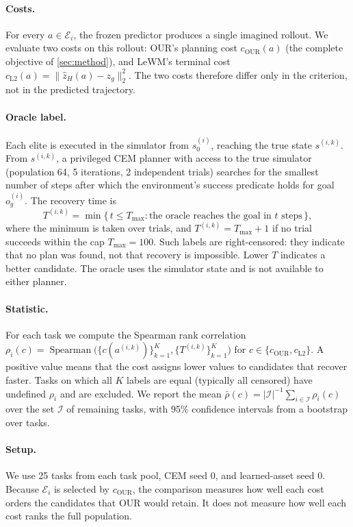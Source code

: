 \documentclass{article} %
\begin{document}
\paragraph{Costs.} For every $a \in \mathcal{E}_i$, the frozen predictor produces a single
imagined rollout. We evaluate two costs on this rollout: OUR's planning cost
$c_{\mathrm{OUR}}(a)$ (the complete objective of \cref{sec:method}), and LeWM's terminal cost
$c_{\mathrm{L2}}(a) = \lVert \hat z_H(a) - z_g \rVert_2^2$. The two costs therefore differ
only in the criterion, not in the predicted trajectory.

\paragraph{Oracle label.} Each elite is executed in the simulator from $s_0^{(i)}$, reaching
the true state $s^{(i,k)}$. From $s^{(i,k)}$, a privileged CEM planner with access to
the true simulator (population 64, 5 iterations, 2 independent trials) searches for the
smallest number of steps after which the environment's success predicate holds for goal
$o_g^{(i)}$. The recovery time is
\begin{equation}
  T^{(i,k)} = \min\bigl\{\, t \le T_{\max} : \text{the oracle reaches the goal in } t \text{ steps} \,\bigr\},
\end{equation}
where the minimum is taken over trials, and $T^{(i,k)} = T_{\max}+1$ if no trial succeeds
within the cap $T_{\max}=100$. Such labels are right-censored: they indicate that no plan was
found, not that recovery is impossible. Lower $T$ indicates a better candidate. The oracle
uses the simulator state and is not available to either planner.

\paragraph{Statistic.} For each task we compute the Spearman rank correlation
$\rho_i(c) = \operatorname{Spearman}\bigl(\{c(a^{(i,k)})\}_{k=1}^{K}, \{T^{(i,k)}\}_{k=1}^{K}\bigr)$
for $c \in \{c_{\mathrm{OUR}}, c_{\mathrm{L2}}\}$. A positive value means that the cost assigns lower values to
candidates that recover faster. Tasks on which all $K$ labels are equal (typically all
censored) have undefined $\rho_i$ and are excluded. We report the mean
$\bar\rho(c) = |\mathcal{I}|^{-1}\sum_{i\in\mathcal{I}} \rho_i(c)$ over the set $\mathcal{I}$ of
remaining tasks, with 95\% confidence intervals from a bootstrap over tasks.

\paragraph{Setup.} We use 25 tasks from each task pool, CEM seed 0, and learned-asset seed 0. Because $\mathcal{E}_i$ is selected by
$c_{\mathrm{OUR}}$, the comparison measures how well each cost orders the candidates that OUR
would retain. It does not measure how well each cost ranks the full population.
\end{document}
